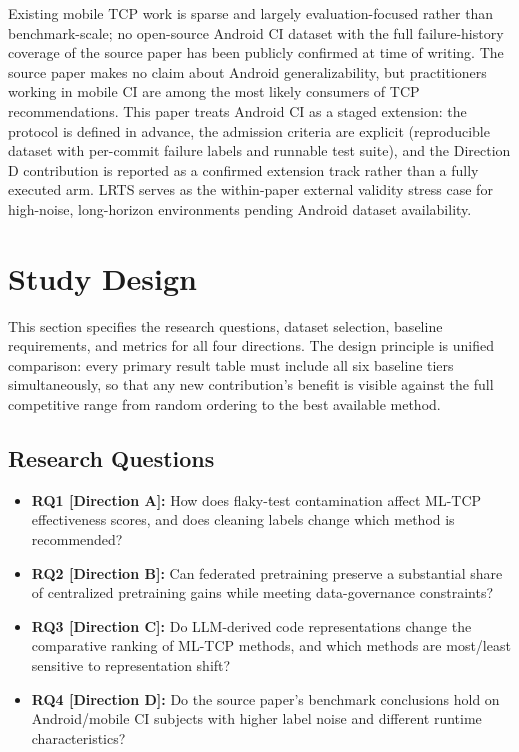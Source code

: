 \documentclass[10pt,conference]{IEEEtran}
\begin{document}
Existing mobile TCP work is sparse and largely evaluation-focused rather than benchmark-scale; no open-source Android CI dataset with the full failure-history coverage of the source paper has been publicly confirmed at time of writing. The source paper makes no claim about Android generalizability, but practitioners working in mobile CI are among the most likely consumers of TCP recommendations. This paper treats Android CI as a staged extension: the protocol is defined in advance, the admission criteria are explicit (reproducible dataset with per-commit failure labels and runnable test suite), and the Direction D contribution is reported as a confirmed extension track rather than a fully executed arm. LRTS serves as the within-paper external validity stress case for high-noise, long-horizon environments pending Android dataset availability.

\section{Study Design}\label{sec:design}

This section specifies the research questions, dataset selection, baseline requirements, and metrics for all four directions. The design principle is unified comparison: every primary result table must include all six baseline tiers simultaneously, so that any new contribution's benefit is visible against the full competitive range from random ordering to the best available method.

\subsection{Research Questions}

\begin{itemize}[leftmargin=*]
\item \textbf{RQ1 [Direction A]:} How does flaky-test contamination affect ML-TCP effectiveness scores, and does cleaning labels change which method is recommended?
\item \textbf{RQ2 [Direction B]:} Can federated pretraining preserve a substantial share of centralized pretraining gains while meeting data-governance constraints?
\item \textbf{RQ3 [Direction C]:} Do LLM-derived code representations change the comparative ranking of ML-TCP methods, and which methods are most/least sensitive to representation shift?
\item \textbf{RQ4 [Direction D]:} Do the source paper's benchmark conclusions hold on Android/mobile CI subjects with higher label noise and different runtime characteristics?
\end{itemize}
\end{document}
